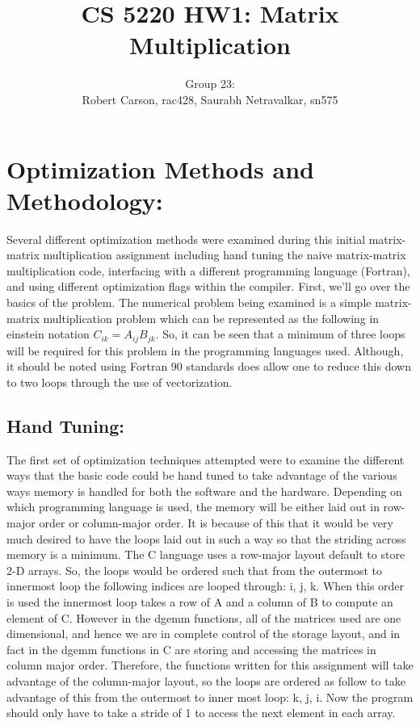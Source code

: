 \documentclass{article}
\begin{document}
\title{CS 5220 HW1: Matrix Multiplication}
\author{Group 23: \\Robert Carson, rac428, Saurabh Netravalkar, sn575}
\renewcommand{\today}{1 Oct. 2015}
\maketitle

\section*{Optimization Methods and Methodology:} 

Several different optimization methods were examined during this initial matrix-matrix multiplication assignment including hand tuning the naive matrix-matrix multiplication code, interfacing with a different programming language (Fortran), and using different optimization flags within the compiler.  First, we'll go over the basics of the problem. The numerical problem being examined is a simple matrix-matrix multiplication problem which can be represented as the following in einstein notation  $C_{ik} = A_{ij}B_{jk}$. 
So, it can be seen that a minimum of three loops will be required for this problem in the programming languages used. Although, it should be noted using Fortran 90 standards does allow one to reduce this down to two loops through the use of vectorization. 

\subsection*{Hand Tuning:}

The first set of optimization techniques attempted were to examine the different ways that the basic code could be hand tuned to take advantage of the various ways memory is handled for both the software and the hardware.  Depending on which programming language is used, the memory will be either laid out in row-major order or column-major order. It is because of this that it would be very much desired to have the loops laid out in such a way so that the striding across memory is a minimum. The C language uses a row-major layout default to store 2-D arrays.  So, the loops would be ordered such that from the outermost to innermost loop the following indices are looped through: i, j, k. When this order is used the innermost loop takes a row of A and a column of B to compute an element of C. However in the dgemm functions, all of the matrices used are one dimensional, and hence we are in complete control of the storage layout, and in fact in the dgemm functions in C are storing and accessing the matrices in column major order.  Therefore, the functions written for this assignment will take advantage of the column-major layout, so the loops are ordered as follow to take advantage of this from the outermost to inner most loop: k, j, i. Now the program should only have to take a stride of 1 to access the next element in each array.
\end{document}
